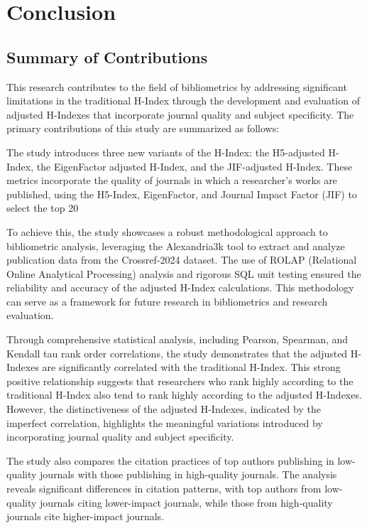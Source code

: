 \chapter{Conclusion}
\label{ch:conclusion}

\section{Summary of Contributions}

This research contributes to the field of bibliometrics by addressing
significant limitations in the traditional H-Index through the development and
evaluation of adjusted H-Indexes that incorporate journal quality and subject
specificity. The primary contributions of this study are summarized as follows:

The study introduces three new variants of the H-Index: the H5-adjusted
H-Index, the EigenFactor adjusted H-Index, and the JIF-adjusted H-Index. These
metrics incorporate the quality of journals in which a researcher’s works are
published, using the H5-Index, EigenFactor, and Journal Impact Factor (JIF) to
select the top 20%

To achieve this, the study showcases a robust methodological approach to
bibliometric analysis, leveraging the Alexandria3k tool to extract and analyze
publication data from the Crossref-2024 dataset. The use of ROLAP (Relational
Online Analytical Processing) analysis and rigorous SQL unit testing ensured
the reliability and accuracy of the adjusted H-Index calculations. This
methodology can serve as a framework for future research in bibliometrics and
research evaluation.

Through comprehensive statistical analysis, including Pearson, Spearman, and
Kendall tau rank order correlations, the study demonstrates that the adjusted
H-Indexes are significantly correlated with the traditional H-Index. This
strong positive relationship suggests that researchers who rank highly
according to the traditional H-Index also tend to rank highly according to the
adjusted H-Indexes. However, the distinctiveness of the adjusted H-Indexes,
indicated by the imperfect correlation, highlights the meaningful variations
introduced by incorporating journal quality and subject specificity.

The study also compares the citation practices of top authors publishing in
low-quality journals with those publishing in high-quality journals. The
analysis reveals significant differences in citation patterns, with top authors
from low-quality journals citing lower-impact journals, while those from
high-quality journals cite higher-impact journals.

